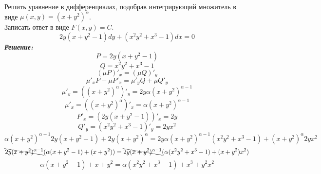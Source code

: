 \documentclass[a5paper, 10pt]{article}
\theoremstyle{definition}
\theoremstyle{plain}
\theoremstyle{remark}
\begin{document}
\section{}
Решить уравнение в дифференциалах, подобрав интегрирующий множитель в виде $\mu (x, y) = (x+y^2)^{\alpha}$.\\
Записать ответ в виде $F(x, y) = C$.
\begin{equation*}
2y(x + y^2 - 1) dy + (x^2y^2+x^3 - 1)dx = 0
\end{equation*}
\textit{\textbf{Решение:}}\\
\begin{equation*}
P = 2y(x + y^2 - 1) 
\end{equation*}
\begin{equation*}
Q = x^2y^2+x^3 - 1
\end{equation*}
\begin{equation*}
\left( \mu P \right)'_x = \left( \mu Q \right)'_y
\end{equation*}
\begin{equation*}
 \mu'_x P + \mu P'_x = \mu'_y Q  +  \mu Q'_y
\end{equation*}
\begin{equation*}
 \mu'_y =  \left(  (x+y^2)^{\alpha} \right)'_y  = 2y{\alpha} (x+y^2)^{\alpha - 1}
\end{equation*}
\begin{equation*}
 \mu'_x =  \left(  (x+y^2)^{\alpha} \right)'_x  = {\alpha} (x+y^2)^{\alpha - 1}
\end{equation*}
\begin{equation*}
 P'_x =  \left(  2y(x + y^2 - 1)  \right)'_x = 2y
\end{equation*}
\begin{equation*}
 Q'_y=  \left(  x^2y^2+x^3 - 1  \right)'_y = 2yx^2
\end{equation*}
\begin{equation*}
  {\alpha} (x+y^2)^{\alpha - 1}  2y(x + y^2 - 1) + 2y(x+y^2)^{\alpha}  = 2y{\alpha} (x+y^2)^{\alpha - 1} ( x^2y^2+x^3 - 1)  +  (x+y^2)^{\alpha}  2yx^2
\end{equation*}
\begin{equation*}
 \bcancel{ 2y (x+y^2)^{\alpha - 1}} ( {\alpha}(x + y^2 - 1) +(x+y^2)) =  \bcancel{ 2y (x+y^2)^{\alpha - 1}}({\alpha} ( x^2y^2+x^3 - 1)  +  (x+y^2)x^2)
\end{equation*}
\begin{equation*}
  {\alpha}(x + y^2 - 1) +x+y^2 =  {\alpha} ( x^2y^2+x^3 - 1)  +  x^3+y^2x^2
\end{equation*}
\end{document}
